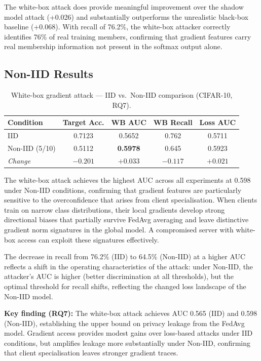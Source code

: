 \documentclass[12pt, a4paper]{report}
\begin{document}
The white-box attack does provide meaningful improvement over the shadow model
attack (+0.026) and substantially outperforms the unrealistic black-box baseline
(+0.068). With recall of 76.2\%, the white-box attacker correctly identifies
76\% of real training members, confirming that gradient features carry real
membership information not present in the softmax output alone.

\subsection{Non-IID Results}

\begin{table}[H]
  \centering
  \caption{White-box gradient attack --- IID vs.\ Non-IID comparison (CIFAR-10, RQ7).}
  \label{tab:whitebox_noniid}
  \begin{tabular}{lcccc}
    \toprule
    \textbf{Condition} & \textbf{Target Acc.} & \textbf{WB AUC} & \textbf{WB Recall} & \textbf{Loss AUC} \\
    \midrule
    IID             & 0.7123 & 0.5652 & 0.762 & 0.5711 \\
    Non-IID (5/10)  & 0.5112 & \textbf{0.5978} & 0.645 & 0.5923 \\
    \midrule
    \textit{Change} & $-0.201$ & $\mathbf{+0.033}$ & $-0.117$ & $+0.021$ \\
    \bottomrule
  \end{tabular}
\end{table}

The white-box attack achieves the highest AUC across all experiments at 0.598
under Non-IID conditions, confirming that gradient features are particularly
sensitive to the overconfidence that arises from client specialisation. When
clients train on narrow class distributions, their local gradients develop
strong directional biases that partially survive FedAvg averaging and leave
distinctive gradient norm signatures in the global model. A compromised server
with white-box access can exploit these signatures effectively.

The decrease in recall from 76.2\% (IID) to 64.5\% (Non-IID) at a higher AUC
reflects a shift in the operating characteristics of the attack: under Non-IID,
the attacker's AUC is higher (better discrimination at all thresholds), but the
optimal threshold for recall shifts, reflecting the changed loss landscape of the
Non-IID model.

\textbf{Key finding (RQ7):} The white-box attack achieves AUC 0.565 (IID) and
0.598 (Non-IID), establishing the upper bound on privacy leakage from the FedAvg
model. Gradient access provides modest gains over loss-based attacks under IID
conditions, but amplifies leakage more substantially under Non-IID, confirming
that client specialisation leaves stronger gradient traces.
\end{document}
